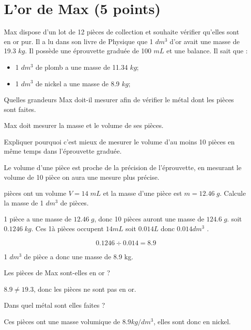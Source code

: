 \section{L'or de Max (5 points)}

Max dispose d'un lot de 12 pièces de collection et souhaite vérifier qu'elles sont en or pur. Il a lu dans son livre de Physique que 1 $dm^3$ d'or avait une masse de \num{19.3} $kg$. Il possède une éprouvette graduée de 100 $mL$ et une balance. Il sait que :

\begin{itemize}
	\item 1 $dm^3$ de plomb a une masse de \num{11.34} $kg$;
	\item 1 $dm^3$ de nickel a une masse de \num{8.9} $kg$;
\end{itemize} 
\begin{questions}
	\question[1] Quelles grandeurs Max doit-il mesurer afin de vérifier le métal dont les pièces sont faites.
	\begin{solution}
		Max doit mesurer la masse et le volume de ses pièces.
	\end{solution}
	
	\question[1] Expliquer pourquoi c'est mieux de mesurer le volume d'au moins 10 pièces en même temps dans l'éprouvette graduée.
	\begin{solution}
		Le volume d'une pièce est proche de la précision de l'éprouvette, en mesurant le volume de 10 pièce on aura une mesure plus précise.
	\end{solution}
	
	 pièces ont un volume $V = 14\; mL$ et la masse d'une pièce est $m  = \num{12,46}\; g$. Calcule la masse de 1 $dm^3$ de pièces.
	\begin{solution}
		1 pièce a une masse de $\num{12,46}\; g$, donc 10 pièces auront une masse de $\num{124,6}\; g$. soit $\num{0,1246}\; kg$. Ces 1à pièces occupent $14 mL$ soit $\num{0.014} L$ donc $\num{0.014} dm^3$ .
		
		\begin{equation*}
			\num{0,1246} \div \num{0.014} = \num{8.9}
		\end{equation*}
		
		1 $dm^3$ de pièce a donc une masse de \num{8.9} kg.
	\end{solution}


	\question[1] Les pièces de Max sont-elles en or ?
	\begin{solution}
		$\num{8.9} \neq \num{19.3}$, donc les pièces ne sont pas en or.
	\end{solution}
	
	\question[1] Dans quel métal sont elles faites ?
	\begin{solution}
		Ces pièces ont une masse volumique de $\num{8.9} kg/dm^3$, elles sont donc en nickel.
	\end{solution}
\end{questions}